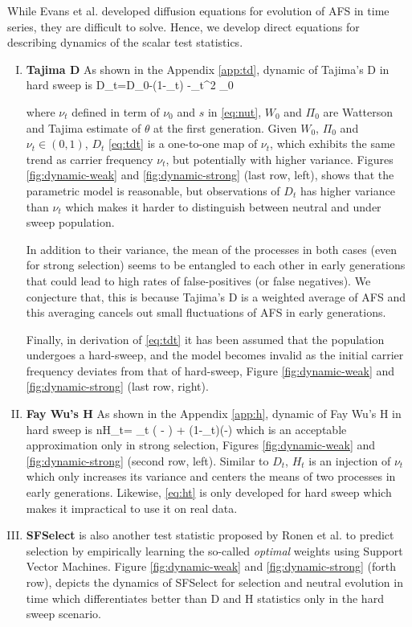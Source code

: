 \documentclass[11pt]{article}
\begin{document}
While Evans et al. \cite{evans2007non} developed diffusion equations for 
evolution of AFS in time series, they are difficult to solve. Hence, we develop 
direct equations for 
describing dynamics of the scalar test statistics.
\begin{enumerate}[I.]
	\item {\bf Tajima D} As shown in the Appendix \ref{app:td}, dynamic of 
	Tajima's D in hard sweep is
	\beq
	D_t=D_0-\log(1-\nu_t)  -\nu_t^2 \Pi_0\label{eq:tdt}
	\eeq

	where $\nu_t$ defined in term of $\nu_0$ and $s$ in \eqref{eq:nut}, $W_0$ 
	and $\Pi_0$ are Watterson and Tajima estimate of $\theta$ at the first 
	generation. Given $W_0$, $\Pi_0$ and $\nu_t \in (0,1)$, $D_t$ 
	\eqref{eq:tdt} is a one-to-one map of $\nu_t$, which exhibits the same 
	trend as carrier frequency $\nu_t$, but potentially with higher variance.
	Figures \ref{fig:dynamic-weak} and \ref{fig:dynamic-strong} (last 
	row, left), shows that the parametric model is reasonable, but observations 
	of $D_t$ has higher variance than $\nu_t$ which makes it harder to 
	distinguish between neutral and under sweep population. 
	
	In addition to their variance, the mean of the processes in both cases 
	(even for strong selection)
	seems to be entangled to each other in early generations  that could lead 
	to high rates of false-positives (or false negatives). We conjecture that, 
	this is because Tajima's D is a weighted average of AFS and this averaging 
	cancels out small fluctuations of AFS in early generations.
	
	Finally, in derivation of \eqref{eq:tdt} it has been assumed that the 
	population undergoes a hard-sweep, and the model becomes invalid as the 
	initial carrier frequency deviates from that of hard-sweep, Figure 
	\ref{fig:dynamic-weak} and \ref{fig:dynamic-strong} (last 
	row, right).
	
	\item {\bf Fay Wu's H} As shown in the Appendix \ref{app:h}, dynamic of Fay 
	Wu's H in 	hard sweep is
	\beq
	nH_t= \theta \nu_t \left( - \right) +
	\theta (1-\nu_t)\left(-\right) 
	\label{eq:ht}
	\eeq
	which is an acceptable approximation only in strong selection, Figures 
	\ref{fig:dynamic-weak} and \ref{fig:dynamic-strong} (second
	row, left). Similar to $D_t$, $H_t$ is an injection of $\nu_t$ which only 
	increases its variance and centers the means of two processes in early 
	generations. Likewise, \eqref{eq:ht} is only developed for hard sweep which 
	makes it impractical to use it on real data.
	
	\item {\bf SFSelect} is also another test statistic proposed by Ronen et 
	al. \cite{ronen2013learning} to predict selection by empirically learning 
	the so-called \emph{optimal} weights using Support Vector Machines. 
	Figure \ref{fig:dynamic-weak} and \ref{fig:dynamic-strong} (forth
	row), depicts the dynamics of SFSelect for selection and neutral evolution 
	in time which differentiates better than D and H statistics only in the 
	hard sweep scenario.
\end{enumerate}
\end{document}
